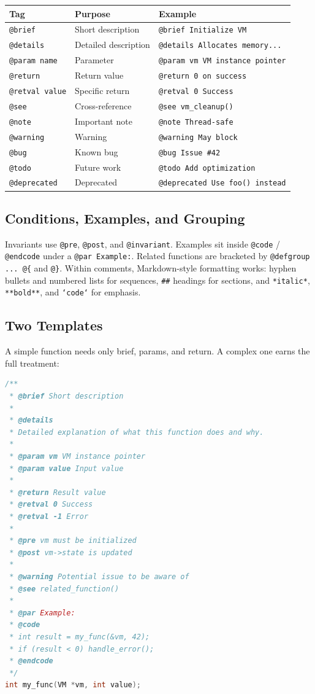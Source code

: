 \begin{tabular}{lll}
\toprule
Tag & Purpose & Example \\
\midrule
\texttt{@brief} & Short description & \texttt{@brief Initialize VM} \\
\texttt{@details} & Detailed description & \texttt{@details Allocates memory...} \\
\texttt{@param name} & Parameter & \texttt{@param vm VM instance pointer} \\
\texttt{@return} & Return value & \texttt{@return 0 on success} \\
\texttt{@retval value} & Specific return & \texttt{@retval 0 Success} \\
\texttt{@see} & Cross-reference & \texttt{@see vm\_cleanup()} \\
\texttt{@note} & Important note & \texttt{@note Thread-safe} \\
\texttt{@warning} & Warning & \texttt{@warning May block} \\
\texttt{@bug} & Known bug & \texttt{@bug Issue \#42} \\
\texttt{@todo} & Future work & \texttt{@todo Add optimization} \\
\texttt{@deprecated} & Deprecated & \texttt{@deprecated Use foo() instead} \\
\bottomrule
\end{tabular}

\subsection{Conditions, Examples, and Grouping}

Invariants use \texttt{@pre}, \texttt{@post}, and \texttt{@invariant}. Examples
sit inside \texttt{@code} / \texttt{@endcode} under a \texttt{@par Example:}.
Related functions are bracketed by \texttt{@defgroup ... @\{} and \texttt{@\}}.
Within comments, Markdown-style formatting works: hyphen bullets and numbered
lists for sequences, \texttt{\#\#} headings for sections, and
\texttt{*italic*}, \texttt{**bold**}, and \texttt{`code`} for emphasis.

\subsection{Two Templates}

A simple function needs only brief, params, and return. A complex one earns the
full treatment:

\begin{lstlisting}[language=C]
/**
 * @brief Short description
 *
 * @details
 * Detailed explanation of what this function does and why.
 *
 * @param vm VM instance pointer
 * @param value Input value
 *
 * @return Result value
 * @retval 0 Success
 * @retval -1 Error
 *
 * @pre vm must be initialized
 * @post vm->state is updated
 *
 * @warning Potential issue to be aware of
 * @see related_function()
 *
 * @par Example:
 * @code
 * int result = my_func(&vm, 42);
 * if (result < 0) handle_error();
 * @endcode
 */
int my_func(VM *vm, int value);
\end{lstlisting}

